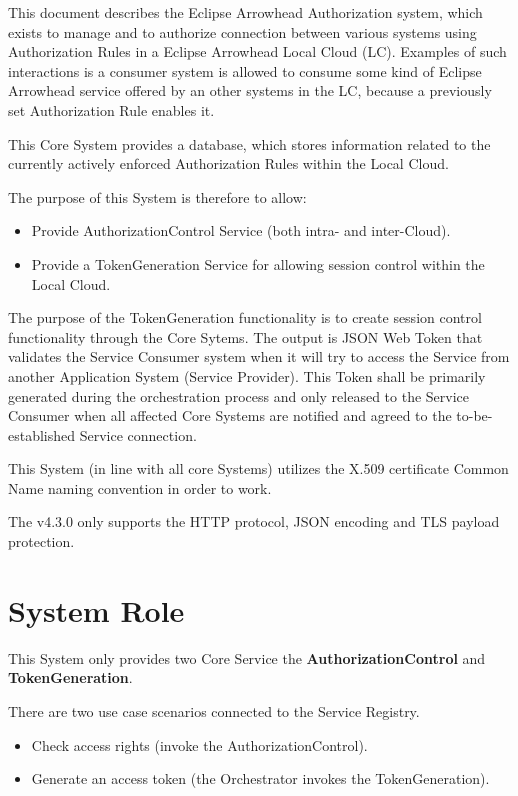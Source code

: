 \documentclass[a4paper]{arrowhead}
\begin{document}
This document describes the Eclipse Arrowhead  Authorization system,
which exists to manage and to authorize connection between various systems using Authorization Rules in a Eclipse Arrowhead Local Cloud (LC).  Examples of such interactions is a consumer system is allowed to consume some kind of Eclipse Arrowhead service offered by an other systems in the LC, because a previously set Authorization Rule enables it. 

This Core System provides a database, which stores information related to the currently actively enforced Authorization Rules  within the Local Cloud.

The purpose of this System is therefore to allow:
\begin{itemize}

\item Provide AuthorizationControl Service (both intra- and inter-Cloud).
\item Provide a TokenGeneration Service for allowing session control within the Local Cloud.
\end{itemize}

The purpose of the TokenGeneration functionality is to create session control functionality through the Core Sytems. The output is JSON Web Token that validates the Service Consumer system when it will try to access the Service from another Application System (Service Provider). This Token shall be primarily generated during the orchestration process and only released to the Service Consumer when all affected Core Systems are notified and agreed to the to-be-established Service connection.

This System (in line with all core Systems) utilizes the X.509 certificate Common Name naming convention in order to work.

The v4.3.0 only supports the HTTP protocol, JSON encoding and TLS payload protection. 


\section{System Role}
\label{sec:role}

This System only provides two Core Service the \textbf{AuthorizationControl} and \textbf{TokenGeneration}. 


There are two use case scenarios connected to the Service Registry.
\begin{itemize}
    \item Check access rights (invoke the AuthorizationControl).
    \item Generate an access token (the Orchestrator invokes the TokenGeneration).
\end{itemize}
\end{document}
